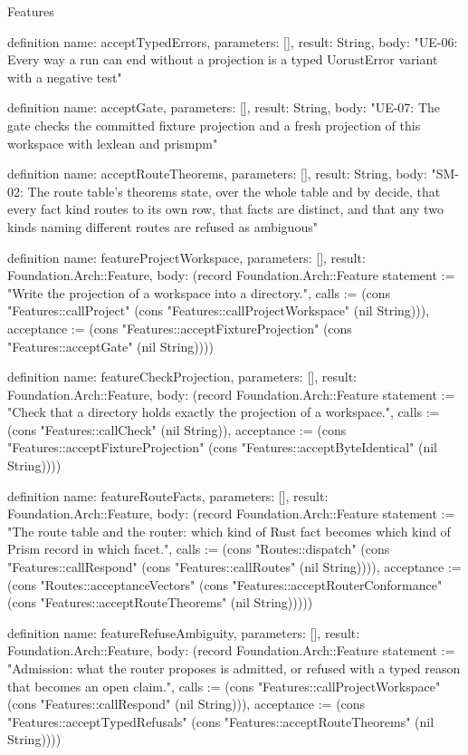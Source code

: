 \begin{lexlean}{Features}
\begin{semanticmodule}
definition{
  name: acceptTypedErrors,
  parameters: [],
  result: String,
  body: "UE-06: Every way a run can end without a projection is a typed UorustError variant with a negative test"
}

definition{
  name: acceptGate,
  parameters: [],
  result: String,
  body: "UE-07: The gate checks the committed fixture projection and a fresh projection of this workspace with lexlean and prismpm"
}

definition{
  name: acceptRouteTheorems,
  parameters: [],
  result: String,
  body: "SM-02: The route table's theorems state, over the whole table and by decide, that every fact kind routes to its own row, that facts are distinct, and that any two kinds naming different routes are refused as ambiguous"
}

definition{
  name: featureProjectWorkspace,
  parameters: [],
  result: Foundation.Arch::Feature,
  body: (record Foundation.Arch::Feature {statement := "Write the projection of a workspace into a directory.", calls := (cons "Features::callProject" (cons "Features::callProjectWorkspace" (nil String))), acceptance := (cons "Features::acceptFixtureProjection" (cons "Features::acceptGate" (nil String)))})
}

definition{
  name: featureCheckProjection,
  parameters: [],
  result: Foundation.Arch::Feature,
  body: (record Foundation.Arch::Feature {statement := "Check that a directory holds exactly the projection of a workspace.", calls := (cons "Features::callCheck" (nil String)), acceptance := (cons "Features::acceptFixtureProjection" (cons "Features::acceptByteIdentical" (nil String)))})
}

definition{
  name: featureRouteFacts,
  parameters: [],
  result: Foundation.Arch::Feature,
  body: (record Foundation.Arch::Feature {statement := "The route table and the router: which kind of Rust fact becomes which kind of Prism record in which facet.", calls := (cons "Routes::dispatch" (cons "Features::callRespond" (cons "Features::callRoutes" (nil String)))), acceptance := (cons "Routes::acceptanceVectors" (cons "Features::acceptRouterConformance" (cons "Features::acceptRouteTheorems" (nil String))))})
}

definition{
  name: featureRefuseAmbiguity,
  parameters: [],
  result: Foundation.Arch::Feature,
  body: (record Foundation.Arch::Feature {statement := "Admission: what the router proposes is admitted, or refused with a typed reason that becomes an open claim.", calls := (cons "Features::callProjectWorkspace" (cons "Features::callRespond" (nil String))), acceptance := (cons "Features::acceptTypedRefusals" (cons "Features::acceptRouteTheorems" (nil String)))})
}


\end{semanticmodule}
\end{lexlean}
